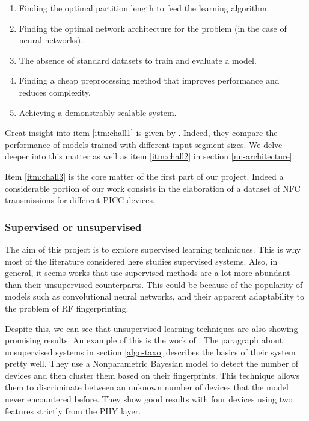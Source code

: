 \begin{enumerate}
  \item \label{itm:chall1} Finding the optimal partition length to feed the learning algorithm.
  \item \label{itm:chall2} Finding the optimal network architecture for the problem (in the case of neural networks).
  \item \label{itm:chall3} The absence of standard datasets to train and evaluate a model.
  \item Finding a cheap preprocessing method that improves performance and reduces complexity.
  \item Achieving a demonstrably scalable system.
\end{enumerate}

Great insight into item \ref{itm:chall1} is given by \textcite{youssef_machine_2017}. Indeed, they compare the performance of models trained with different input segment sizes. We delve deeper into this matter as well as item \ref{itm:chall2} in section \ref{nn-architecture}.

Item \ref{itm:chall3} is the core matter of the first part of our project. Indeed a considerable portion of our work consists in the elaboration of a dataset of NFC transmissions for different PICC devices.

\subsubsection{Supervised or unsupervised}

The aim of this project is to explore supervised learning techniques. This is why most of the literature considered here studies supervised systems. Also, in general, it seems works that use supervised methods are a lot more abundant than their unsupervised counterparts. This could be because of the popularity of models such as convolutional neural networks, and their apparent adaptability to the problem of RF fingerprinting.

Despite this, we can see that unsupervised learning techniques are also showing promising results. An example of this is the work of \textcite{nguyen_device_2011}. The paragraph about unsupervised systems in section \ref{algo-taxo} describes the basics of their system pretty well. They use a Nonparametric Bayesian model to detect the number of devices and then cluster them based on their fingerprints. This technique allows them to discriminate between an unknown number of devices that the model never encountered before. They show good results with four devices using two features strictly from the PHY layer.

